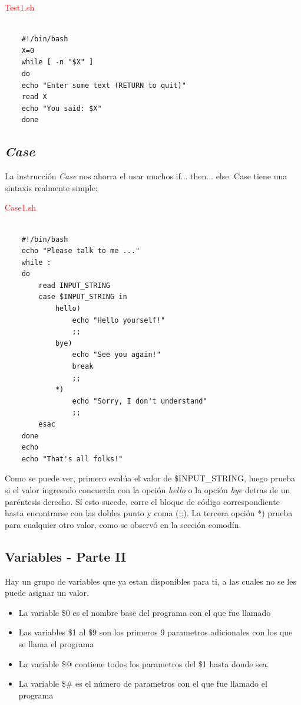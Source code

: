 \documentclass{article}
\begin{document}
\textcolor{red}{Test1.sh}
\begin{framed}
\begin{verbatim}
	
    #!/bin/bash
    X=0
    while [ -n "$X" ]
    do
    echo "Enter some text (RETURN to quit)"
    read X
    echo "You said: $X"
    done
\end{verbatim}
\end{framed}

\subsection{ \textit{Case} }

La instrucción \textit{Case} nos ahorra el usar muchos if... then... else. Case tiene una sintaxis realmente simple:

\textcolor{red}{Case1.sh}
\begin{framed}
\begin{verbatim}
	
    #!/bin/bash
    echo "Please talk to me ..."
    while :
    do
    	read INPUT_STRING
    	case $INPUT_STRING in
			hello)
            	echo "Hello yourself!"
                ;;
    		bye)
    			echo "See you again!"
    			break
   				;;
    		*)
    			echo "Sorry, I don't understand"
    			;;
    	esac
    done
    echo 
    echo "That's all folks!"
\end{verbatim}
\end{framed}

Como se puede ver, primero evalúa el valor de \$INPUT\_STRING, luego prueba si el valor ingresado concuerda con la opción \textit{hello} o la opción \textit{bye} detras de un paréntesis derecho. Sí esto sucede, corre el bloque de código correspondiente hasta encontrarse con las dobles punto y coma (;;). La tercera opción *) prueba para cualquier otro valor, como se observó en la sección comodín.

\subsection{Variables - Parte II}

Hay un grupo de variables que ya estan disponibles para ti, a las cuales no se les puede asignar un valor.
\begin{itemize}
\item La variable \$0 es el nombre base del programa con el que fue llamado
\item Las variables \$1 al \$9 son los primeros 9 parametros adicionales con los que se llama el programa
\item La variable \$@ contiene todos los parametros del \$1 hasta donde sea.
\item La variable \$\# es el número de parametros con el que fue llamado el programa
\end{itemize}
\end{document}

